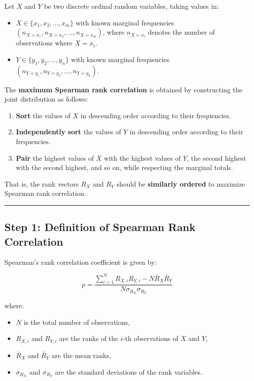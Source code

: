 \documentclass[
  12pt,
  letterpaper,
  DIV=11,
  numbers=noendperiod]{scrartcl}
\providecommand{\tightlist}{%
  \setlength{\itemsep}{0pt}\setlength{\parskip}{0pt}}\usepackage{longtable,booktabs,array}
\begin{document}
Let \(X\) and \(Y\) be two discrete ordinal random variables, taking
values in:

\begin{itemize}
\tightlist
\item
  \(X \in \{x_1, x_2, \dots, x_m\}\) with known marginal frequencies
  \((n_{X=x_1}, n_{X=x_2}, ..., n_{X=x_m})\), where \(n_{X=x_i}\)
  denotes the number of observations where \(X = x_i\).
\item
  \(Y \in \{y_1, y_2, \dots, y_n\}\) with known marginal frequencies
  \((n_{Y=y_1}, n_{Y=y_2}, ..., n_{Y=y_n})\).
\end{itemize}

The \textbf{maximum Spearman rank correlation} is obtained by
constructing the joint distribution as follows:

\begin{enumerate}
\def\labelenumi{\arabic{enumi}.}
\tightlist
\item
  \textbf{Sort} the values of \(X\) in descending order according to
  their frequencies.
\item
  \textbf{Independently sort} the values of \(Y\) in descending order
  according to their frequencies.
\item
  \textbf{Pair} the highest values of \(X\) with the highest values of
  \(Y\), the second highest with the second highest, and so on, while
  respecting the marginal totals.
\end{enumerate}

That is, the rank vectors \(R_X\) and \(R_Y\) should be
\textbf{similarly ordered} to maximize Spearman rank correlation.

\begin{center}\rule{0.5\linewidth}{0.5pt}\end{center}

\subsection{\texorpdfstring{\textbf{Step 1: Definition of Spearman Rank
Correlation}}{Step 1: Definition of Spearman Rank Correlation}}\label{step-1-definition-of-spearman-rank-correlation}

Spearman's rank correlation coefficient is given by:

\[\rho = \frac{\sum_{i=1}^{N} R_{X,i} R_{Y,i} - N \bar{R}_X \bar{R}_Y}{N \sigma_{R_X} \sigma_{R_Y}}\]

where:

\begin{itemize}
\tightlist
\item
  \(N\) is the total number of observations,
\item
  \(R_{X,i}\) and \(R_{Y,i}\) are the ranks of the \(i\)-th observations
  of \(X\) and \(Y\),
\item
  \(\bar{R}_X\) and \(\bar{R}_Y\) are the mean ranks,
\item
  \(\sigma_{R_X}\) and \(\sigma_{R_Y}\) are the standard deviations of
  the rank variables.
\end{itemize}
\end{document}
